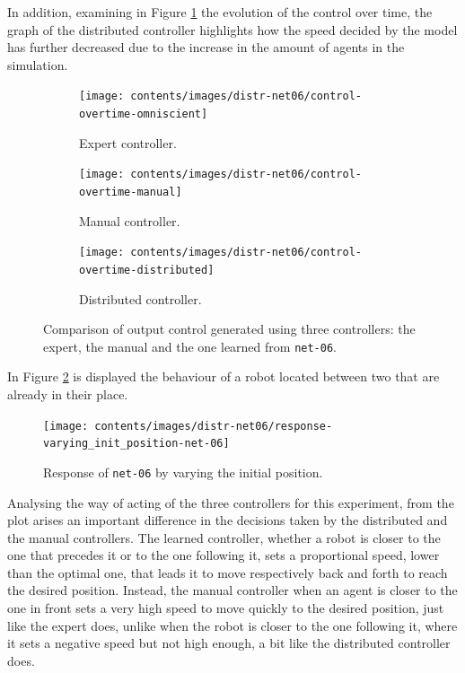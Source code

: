 In addition, examining in Figure \ref{fig:net06control} the evolution of the 
control over time, the graph of the distributed controller highlights how the 
speed decided by the model has further decreased due to the increase in the 
amount of agents in the simulation.
\begin{figure}[!htb]
	\centering
	\begin{subfigure}[h]{0.3\textwidth}
		\centering
		\texttt{[image: contents/images/distr-net06/control-overtime-omniscient]}%
		\caption{Expert controller.}
	\end{subfigure}
	\hfill
	\begin{subfigure}[h]{0.3\textwidth}
		\centering
		\texttt{[image: contents/images/distr-net06/control-overtime-manual]}%
		\caption{Manual controller.}
	\end{subfigure}
	\hfill
	\begin{subfigure}[h]{0.3\textwidth}
		\centering
		\texttt{[image: contents/images/distr-net06/control-overtime-distributed]}
		\caption{Distributed controller.}
	\end{subfigure}
	\caption[Evaluation of the control learned by \texttt{net-06}.]{Comparison 
		of output control generated using three controllers: the expert, the 
		manual 
		and the one learned from \texttt{net-06}.}
	\label{fig:net06control}
\end{figure}

In Figure \ref{fig:net06responseposition} is displayed the behaviour of a robot 
located between two that are already in their place.
\begin{figure}[!htb]
	\centering
	\texttt{[image: contents/images/distr-net06/response-varying\_init\_position-net-06]}%
	\caption{Response of \texttt{net-06} by varying the initial position.}
	\label{fig:net06responseposition}
\end{figure}
Analysing the way of acting of the three controllers for this experiment, from 
the plot arises an important difference in the decisions taken by the distributed 
and the manual controllers.
The learned controller, whether a robot is closer to the one that precedes it 
or to the one following it, sets a proportional speed, lower than the optimal one, 
that leads it to move respectively back and forth to reach the desired position.
Instead, the manual controller when an agent is closer to the one in front 
sets a very high speed to move quickly to the desired position, just like the expert 
does, unlike when the robot is closer to the one following it, where it sets a 
negative speed but not high enough, a bit like the distributed controller does.

